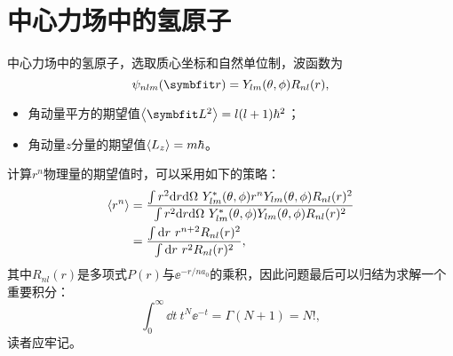 \section{中心力场中的氢原子}

中心力场中的氢原子，选取质心坐标和自然单位制，波函数为
\begin{equation}
    \psi_{nlm}(\rr) = Y_{lm}(\theta,\phi) R_{nl}(r),
\end{equation}

\begin{itemize}
    \item 角动量平方的期望值$\expval{\LL^2}=l(l+1)\hbar^2$；
    \item 角动量$z$分量的期望值$\expval{L_z}=m\hbar$。
\end{itemize}

计算$r^n$物理量的期望值时，可以采用如下的策略：
\begin{equation}
\begin{aligned}
    \expval{r^n}
    &= \frac{\int r^2 \dd r \dd\Omega \ Y_{lm}^*(\theta,\phi) r^n Y_{lm}(\theta,\phi) R_{nl}(r)^2}{\int r^2 \dd r \dd\Omega \ Y_{lm}^*(\theta,\phi) Y_{lm}(\theta,\phi) R_{nl}(r)^2} \\
    &= \frac{\int\dd r \ r^{n+2} R_{nl}(r)^2}{\int\dd r \ r^2 R_{nl}(r)^2},
\end{aligned}
\end{equation}
其中$R_{nl}(r)$是多项式$P(r)$与$\ee^{-r/na_0}$的乘积，因此问题最后可以归结为求解一个重要积分：
\begin{equation}
    \int_0^\infty \dd t \ t^{N} \ee^{-t} = \Gamma(N+1) = N!,
\end{equation}
读者应牢记。
